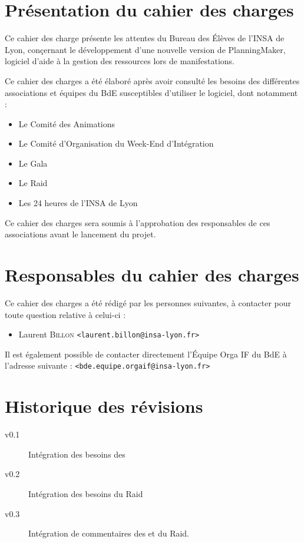 \section{Présentation du cahier des charges}
Ce cahier des charge présente les attentes du Bureau des Élèves de l'INSA de Lyon, conçernant le développement d'une nouvelle version de PlanningMaker, logiciel
d'aide à la gestion des ressources lors de manifestations.

Ce cahier des charges a été élaboré après avoir consulté les besoins des différentes associations et équipes du BdE susceptibles d'utiliser le logiciel, dont notamment : 
\begin{itemize}
\item Le Comité des Animations
\item Le Comité d'Organisation du Week-End d'Intégration
\item Le Gala
\item Le Raid
\item Les 24 heures de l'INSA de Lyon
\end{itemize}

Ce cahier des charges sera soumis à l'approbation des responsables de ces associations avant le lancement du projet.

\section{Responsables du cahier des charges}
Ce cahier des charges a été rédigé par les personnes suivantes, à contacter pour toute question relative à celui-ci : 
\begin{itemize}
 \item Laurent \textsc{Billon} \texttt{<laurent.billon@insa-lyon.fr>}
\end{itemize}

Il est également possible de contacter directement l'Équipe Orga IF du BdE à l'adresse suivante : \texttt{<bde.equipe.orgaif@insa-lyon.fr>}

\section{Historique des révisions}

\begin{description}
\item[v0.1] Intégration des besoins des 
\item[v0.2] Intégration des besoins du Raid
\item[v0.3] Intégration de commentaires des  et du Raid.
\end{description}